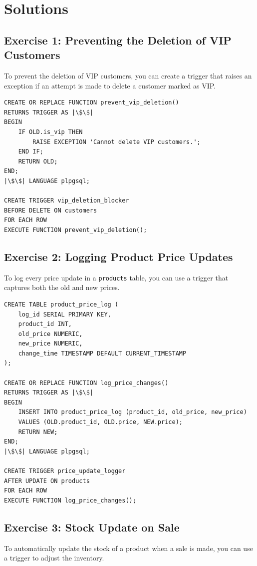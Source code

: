 \documentclass{article}
\begin{document}
\newpage

\section*{Solutions}

\subsection*{Exercise 1: Preventing the Deletion of VIP Customers}
To prevent the deletion of VIP customers, you can create a trigger that raises an exception if an attempt is made to delete a customer marked as VIP.

\begin{verbatim}
CREATE OR REPLACE FUNCTION prevent_vip_deletion()
RETURNS TRIGGER AS |\$\$|
BEGIN
    IF OLD.is_vip THEN
        RAISE EXCEPTION 'Cannot delete VIP customers.';
    END IF;
    RETURN OLD;
END;
|\$\$| LANGUAGE plpgsql;

CREATE TRIGGER vip_deletion_blocker
BEFORE DELETE ON customers
FOR EACH ROW
EXECUTE FUNCTION prevent_vip_deletion();
\end{verbatim}

\subsection*{Exercise 2: Logging Product Price Updates}
To log every price update in a \texttt{products} table, you can use a trigger that captures both the old and new prices.

\begin{verbatim}
CREATE TABLE product_price_log (
    log_id SERIAL PRIMARY KEY,
    product_id INT,
    old_price NUMERIC,
    new_price NUMERIC,
    change_time TIMESTAMP DEFAULT CURRENT_TIMESTAMP
);

CREATE OR REPLACE FUNCTION log_price_changes()
RETURNS TRIGGER AS |\$\$|
BEGIN
    INSERT INTO product_price_log (product_id, old_price, new_price)
    VALUES (OLD.product_id, OLD.price, NEW.price);
    RETURN NEW;
END;
|\$\$| LANGUAGE plpgsql;

CREATE TRIGGER price_update_logger
AFTER UPDATE ON products
FOR EACH ROW
EXECUTE FUNCTION log_price_changes();
\end{verbatim}

\subsection*{Exercise 3: Stock Update on Sale}
To automatically update the stock of a product when a sale is made, you can use a trigger to adjust the inventory.
\end{document}
